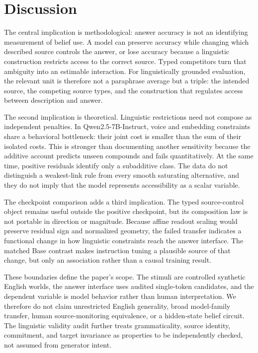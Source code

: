 \section{Discussion}

The central implication is methodological: answer accuracy is not an identifying
measurement of belief use. A model can preserve accuracy while changing which
described source controls the answer, or lose accuracy because a linguistic
construction restricts access to the correct source. Typed competitors turn
that ambiguity into an estimable interaction. For linguistically grounded
evaluation, the relevant unit is therefore not a paraphrase average but a
triple: the intended source, the competing source types, and the construction
that regulates access between description and answer.

The second implication is theoretical. Linguistic restrictions need not compose
as independent penalties. In Qwen2.5-7B-Instruct, voice and embedding constraints
share a behavioral bottleneck: their joint cost is smaller than the sum of their
isolated costs. This is stronger than documenting another sensitivity because
the additive account predicts unseen compounds and fails quantitatively. At the
same time, positive residuals identify only a subadditive class. The data do not
distinguish a weakest-link rule from every smooth saturating alternative, and
they do not imply that the model represents accessibility as a scalar variable.

The checkpoint comparison adds a third implication. The typed source-control
object remains useful outside the positive checkpoint, but its composition law
is not portable in direction or magnitude. Because affine readout scaling would
preserve residual sign and normalized geometry, the failed transfer indicates a
functional change in how linguistic constraints reach the answer interface.
The matched Base contrast makes instruction tuning a plausible source of that
change, but only an association rather than a causal training result.

These boundaries define the paper's scope. The stimuli are controlled synthetic
English worlds, the answer interface uses audited single-token candidates, and
the dependent variable is model behavior rather than human interpretation. We
therefore do not claim unrestricted English generality, broad model-family
transfer, human source-monitoring equivalence, or a hidden-state belief circuit.
The linguistic validity audit further treats grammaticality, source identity,
commitment, and target invariance as properties to be independently checked,
not assumed from generator intent.

